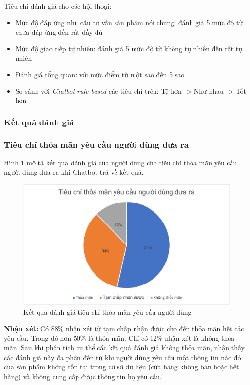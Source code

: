 Tiêu chí đánh giá cho các hội thoại:

\begin{itemize}
    \item Mức độ đáp ứng nhu cầu tư vấn sản phẩm nói chung: đánh giá
    5 mức độ từ chưa đáp ứng đến rất đầy đủ
    \item Mức độ giao tiếp tự nhiên: đánh giá 5 mức độ từ không
    tự nhiên đến rất tự nhiên
    \item Đánh giá tổng quan: với mức điểm từ một sao đến 5 sao
    \item So sánh với \textit{Chatbot rule-based} các tiêu chí trên:
    Tệ hơn -> Như nhau -> Tốt hơn
\end{itemize}

\subsubsection{Kết quả đánh giá}

\subsubsection{Tiêu chí thỏa mãn yêu cầu người dùng đưa ra}
Hình \ref{fig:tieuchi1} mô tả kết quả đánh giá của người dùng cho
tiêu chí thỏa mãn yêu cầu người dùng đưa ra khi Chatbot trả về kết quả.

\begin{figure}[ht!]
    \centering
    \includegraphics[scale=0.91]{thesis/chatbot/ketqua/img/tieuchi1.png}
    \caption{Kết quả đánh giá tiêu chí thỏa mãn yêu cầu người dùng}
    \label{fig:tieuchi1}
\end{figure}

\textbf{Nhận xét:}
Có 88\% nhận xét từ tạm chấp nhận được cho đến thỏa mãn hết các
yêu cầu. Trong đó hơn 50\% là thỏa mãn. Chỉ có 12\% nhận xét là không
thỏa mãn. Sau khi phân tích cụ thể các kết quả đánh giá không
thỏa mãn, nhận thấy các đánh giá này đa phần đến từ khi người dùng
yêu cầu một thông tin nào đó của sản phẩm không tồn tại trong cơ sở
dữ liệu (cửa hàng không bán hoặc hết hàng) và không cung cấp được
thông tin họ yêu cầu.

